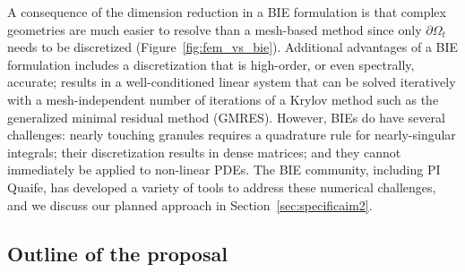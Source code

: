 A consequence of the dimension reduction in a BIE formulation is that
complex geometries are much easier to resolve than a mesh-based method
since only $\partial \Omega_t$ needs to be discretized
(Figure~\ref{fig:fem_vs_bie}). Additional advantages of a BIE
formulation includes a discretization that is high-order, or even
spectrally, accurate; results in a well-conditioned linear system that
can be solved iteratively with a mesh-independent number of iterations
of a Krylov method such as the generalized minimal residual method
(GMRES). However, BIEs do have several challenges: nearly touching
granules requires a quadrature rule for nearly-singular integrals; their
discretization results in dense matrices; and they cannot immediately be
applied to non-linear PDEs. The BIE community, including PI Quaife, has
developed a variety of tools to address these numerical challenges, and
we discuss our planned approach in Section~\ref{sec:specificaim2}.




\subsection{Outline of the proposal}
